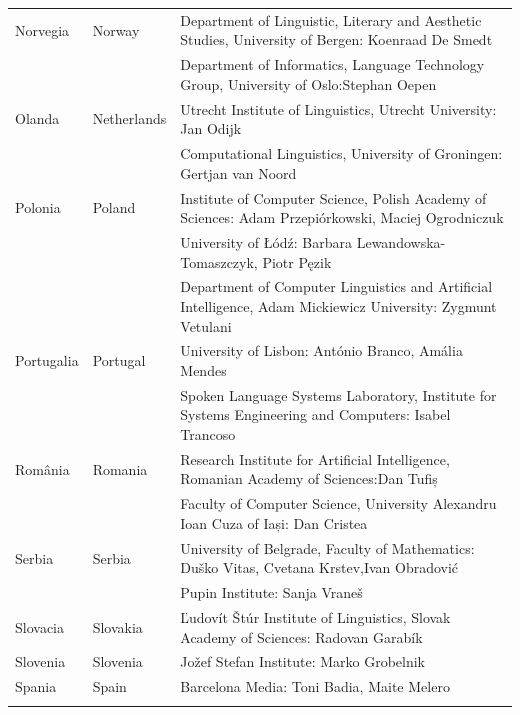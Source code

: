 \begin{longtable}{@{}llp{113mm}@{}}
  Norvegia & \textcolor{grey1}{Norway} & Department of Linguistic, Literary and Aesthetic Studies, University of Bergen: Koenraad De Smedt\\ \addlinespace 
  & & Department of Informatics, Language Technology Group, University of Oslo:\newline Stephan Oepen \\ \addlinespace
  Olanda & \textcolor{grey1}{Netherlands} & Utrecht Institute of Linguistics, Utrecht University: Jan Odijk\\ \addlinespace 
  & & Computational Linguistics, University of Groningen: Gertjan van Noord\\ \addlinespace
  Polonia & \textcolor{grey1}{Poland} & Institute of Computer Science, Polish Academy of Sciences: Adam Przepiórkowski, Maciej Ogrodniczuk \\ \addlinespace
  & & University of Łódź: Barbara Lewandowska-Tomaszczyk, Piotr Pęzik\\ \addlinespace
  & & Department of Computer Linguistics and Artificial Intelligence, Adam Mickiewicz University: Zygmunt Vetulani \\ \addlinespace
  Portugalia & \textcolor{grey1}{Portugal} & University of Lisbon: António Branco, Amália Mendes \\ \addlinespace
  & & Spoken Language Systems Laboratory, Institute for Systems Engineering and Computers: Isabel Trancoso \\ \addlinespace
  România & \textcolor{grey1}{Romania} & Research Institute for Artificial Intelligence, Romanian Academy of Sciences:\newline Dan Tufiș \\ \addlinespace
  & & Faculty of Computer Science, University Alexandru Ioan Cuza of Iași: Dan Cristea \\ \addlinespace
  Serbia & \textcolor{grey1}{Serbia} & University of Belgrade, Faculty of Mathematics: Duško Vitas, Cvetana Krstev,\newline Ivan Obradović \\ \addlinespace
  & & Pupin Institute: Sanja Vraneš \\ \addlinespace  
  Slovacia & \textcolor{grey1}{Slovakia} & Ľudovít Štúr Institute of Linguistics, Slovak Academy of Sciences: Radovan Garabík \\ \addlinespace 
  Slovenia & \textcolor{grey1}{Slovenia} & Jožef Stefan Institute: Marko Grobelnik \\ \addlinespace 
  Spania & \textcolor{grey1}{Spain} & Barcelona Media: Toni Badia, Maite Melero \\ \addlinespace 

\end{longtable}
